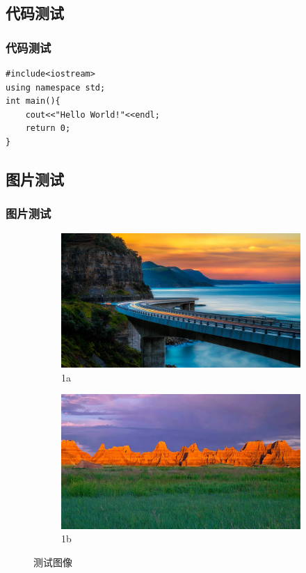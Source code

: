 \documentclass[presentation,aspectratio=1610]{beamer}
\begin{document}
\subsection{代码测试}

\begin{frame}[fragile] %
\frametitle{代码测试}
\begin{example}
\begin{verbatim}
#include<iostream>
using namespace std;
int main(){
    cout<<"Hello World!"<<endl;
    return 0;
}
\end{verbatim}
\end{example}
\end{frame}


\subsection{图片测试}

\begin{frame}
\frametitle{图片测试}
\begin{figure}
	\begin{subfigure}{0.45\textwidth}
	  \centering
	  \includegraphics[width=0.8\linewidth]{image1.jpg}
	  \caption{1a}
	  \label{fig:sfig1}
	\end{subfigure}%
	\begin{subfigure}{0.45\textwidth}
	  \centering
	  \includegraphics[width=0.8\linewidth]{image2.jpg}
	  \caption{1b}
	  \label{fig:sfig2}
	\end{subfigure}
	\caption{测试图像}
	\label{fig:fig}
	\end{figure}
\end{frame}
\end{document}
